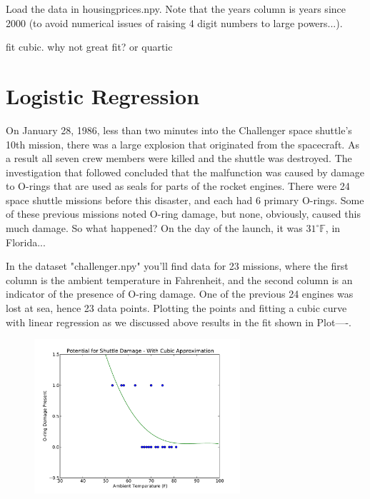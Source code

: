 Load the data in housingprices.npy. Note that the years column is years since 2000 (to avoid numerical issues of raising 4 digit numbers to large powers...). 
\begin{problem}
fit cubic. why not great fit? or quartic
\end{problem}


\section*{Logistic Regression}
On January 28, 1986, less than two minutes into the Challenger space shuttle's 10th mission, there was a large explosion that originated from the spacecraft. As a result all seven crew members were killed and the shuttle was destroyed. The investigation that followed concluded that the malfunction was caused by damage to O-rings that are used as seals for parts of the rocket engines. There were 24 space shuttle missions before this disaster, and each had 6 primary O-rings. Some of these previous missions noted O-ring damage, but none, obviously, caused this much damage. So what happened? On  the day of the launch, it was $31^{\circ}  \mathbb{F}$, in Florida...

In the dataset "challenger.npy" you'll find data for 23 missions, where the first column is the ambient temperature in Fahrenheit, and the second column is an indicator of the presence of O-ring damage. One of the previous 24 engines was lost at sea, hence 23 data points.  Plotting the points and fitting a cubic curve with linear regression as we discussed above results in the fit shown in Plot----. 

\begin{figure}[h]
\label{badfit}
\centering
\includegraphics[width=3in]{cubicthrulogitpoints.pdf}
\end{figure}

